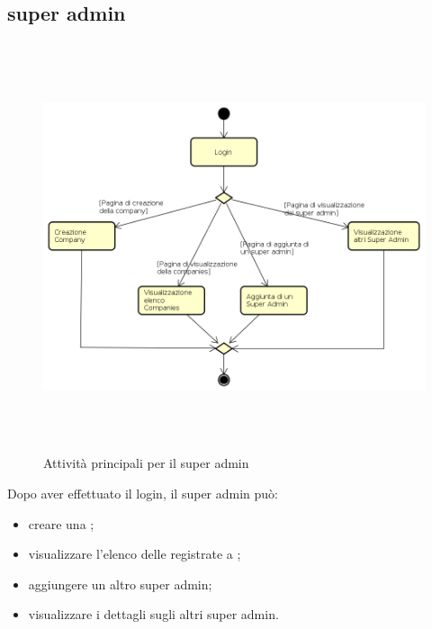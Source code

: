 \subsection{super admin}
\begin{figure}[H]
\begin{center}
\includegraphics[height=12cm]{res/sections/backend/activities/principaliSuperAdmin.png}
\caption{Attività principali per il super admin}
\end{center}
\end{figure}
Dopo aver effettuato il login, il super admin può:
\begin{itemize}
\item creare una ;
\item visualizzare l'elenco delle  registrate a ;
\item aggiungere un altro super admin;
\item visualizzare i dettagli sugli altri super admin.
\end{itemize}
